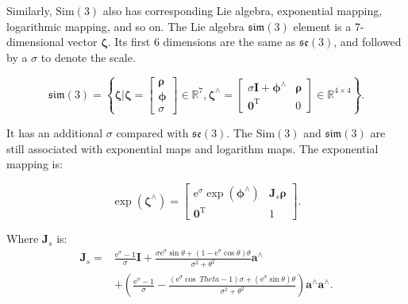 Similarly, $\mathrm{Sim}(3)$ also has corresponding Lie algebra, exponential mapping, logarithmic mapping, and so on. The Lie algebra $\mathfrak{sim}(3)$ element is a 7-dimensional vector $\boldsymbol{\zeta}$. Its first 6 dimensions are the same as $\mathfrak{se}(3)$, and followed by a $\sigma$ to denote the scale.

\begin{equation}
\mathfrak{sim} \left( 3 \right) = \left\{ { \boldsymbol{\zeta} | \boldsymbol{\zeta} = \left[ \begin{array}{l}
    \boldsymbol{\rho} \\
    \boldsymbol{\phi} \\
    \sigma
    \end{array} \right] \in { \mathbb{R}^7},{ \boldsymbol{\zeta} ^ \wedge } = \left[ {\begin{array}{*{20}{c}}
        {\sigma \mathbf{I} + {\boldsymbol{\phi} ^ \wedge }}&\boldsymbol{\rho} \\
        {{\mathbf{0}^\mathrm{T}}}&0
        \end{array}} \right] \in {\mathbb{R}^{4 \times 4}}} \right\}.
\end{equation}

It has an additional $\sigma$ compared with $\mathfrak{se}(3)$. The $\mathrm{Sim}(3)$ and $\mathfrak{sim}(3)$ are still associated with exponential maps and logarithm maps. The exponential mapping is:

\begin{equation}
\exp \left( {{ \boldsymbol{\zeta} ^ \wedge }} \right) = \left[ {\begin{array}{*{20}{c}}
    {{\mathrm{e}^\sigma }\exp \left( {{ \boldsymbol{\phi} ^ \wedge }} \right)}&{ \mathbf{J}_s \boldsymbol{\rho} }\\
    {{\mathbf{0}^\mathrm{T}}}&1
    \end{array}} \right].
\end{equation}

Where $\mathbf{J}_s$ is:
\begin{align*}
{ \mathbf{J}_s} =& \frac{{{\mathrm{e}^\sigma } - 1}}{\sigma } \mathbf{I} + \frac{ \sigma {{\mathrm{e} ^\sigma }\sin \theta + \left( {1 - {\mathrm{e}^\sigma }\cos \theta } \right)\theta }}{{{\sigma ^2} + {\theta ^ 2}}}{\mathbf{a}^ \wedge }\\
&+ \left( {\frac{{{\mathrm{e}^\sigma } - 1}}{\sigma } - \frac{{\left( {{\mathrm{e}^\sigma }\cos \ Theta - 1} \right)\sigma + ({\mathrm{e}^\sigma }\sin \theta )\theta }}{{{\sigma ^2} + {\theta ^2}}}} \right ){\mathbf{a}^ \wedge }{\mathbf{a}^ \wedge }.
\end{align*}


